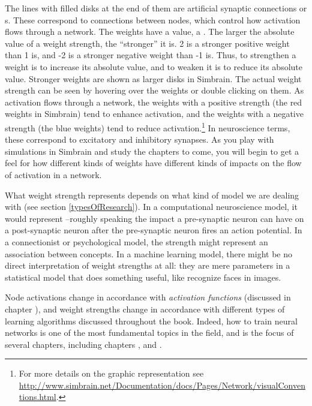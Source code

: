 
The lines with filled disks at the end of them are artificial synaptic connections or s. These correspond to connections between nodes, which control how activation flows through a network. The weights have a value, a . The larger the absolute value of a weight strength, the ``stronger'' it is.  2 is a stronger positive weight than 1 is, and -2 is a stronger negative weight than -1 is. Thus, to strengthen a weight is to increase its absolute value, and to weaken it is to reduce its absolute value.  Stronger weights are shown as larger disks in Simbrain. The actual weight strength can be seen by hovering over the weights or double clicking on them.  As activation flows through a network, the weights with a positive strength (the red weights in Simbrain) tend to enhance activation, and the weights with a negative strength (the blue weights) tend to reduce activation.\footnote{For more details on the graphic representation see \url{http://www.simbrain.net/Documentation/docs/Pages/Network/visualConventions.html}.} In neuroscience terms, these correspond to excitatory and inhibitory synapses. As you play with simulations in Simbrain and study the chapters to come, you will begin to get a feel for how different kinds of weights have different kinds of impacts on the flow of activation in a network. 

What weight strength represents depends on what kind of model we are dealing with (see section \ref{typesOfResearch}). In a computational neuroscience model, it would represent --roughly speaking the impact a pre-synaptic neuron can have on a post-synaptic neuron after the pre-synaptic neuron fires an action potential. In a connectionist or psychological model, the strength might represent an association between concepts. In a machine learning model, there might be no direct interpretation of weight strengths at all: they are mere parameters in a statistical model that does something useful, like recognize faces in images.

Node activations change in accordance with \emph{activation functions} (discussed in chapter ), and weight strengths change in accordance with different types of learning algorithms discussed throughout the book. Indeed, how to train neural networks is one of the most fundamental topics in the field, and is the focus of several chapters, including chapters ,  and . 

